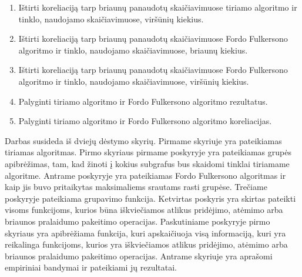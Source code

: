 \begin{enumerate}
\begin{enumerate}
			\item Ištirti koreliaciją tarp briaunų panaudotų skaičiavimuose tiriamo algoritmo ir tinklo, naudojamo skaičiavimuose, viršūnių kiekius. 
			\item Ištirti koreliaciją tarp briaunų panaudotų skaičiavimuose Fordo Fulkersono algoritmo ir tinklo, naudojamo skaičiavimuose, briaunų kiekius. 
			\item Ištirti koreliaciją tarp briaunų panaudotų skaičiavimuose Fordo Fulkersono algoritmo ir tinklo, naudojamo skaičiavimuose, viršūnių kiekius. 
			\item Palyginti tiriamo algoritmo ir Fordo Fulkersono algoritmo rezultatus.
			\item Palyginti tiriamo algoritmo ir Fordo Fulkersono algoritmo koreliacijas.
	\end{enumerate}
\end{enumerate}

Darbas susideda iš dviejų dėstymo skyrių. Pirmame skyriuje yra pateikiamas tiriamas algoritmas. Pirmo skyriaus pirmame poskyryje yra pateikiamas grupės apibrėžimas, tam, kad žinoti į kokius subgrafus bus skaidomi tinklai tiriamame algoritme. Antrame poskyryje yra pateikiamas Fordo Fulkersono algoritmas ir kaip jis buvo pritaikytas maksimaliems srautams rasti grupėse. Trečiame poskyryje pateikiama grupavimo funkcija. Ketvirtas poskyris yra skirtas pateikti visoms funkcijoms, kurios būna iškviečiamos  atlikus pridėjimo, atėmimo arba briaunos pralaidumo pakeitimo operacijas. Paskutiniame poskyryje pirmo skyriaus yra apibrėžiama funkcija, kuri apskaičiuoja visą informaciją, kuri yra  reikalinga funkcijoms, kurios yra iškviečiamos atlikus pridėjimo, atėmimo arba briaunos pralaidumo pakeitimo operacijas. Antrame skyriuje yra aprašomi empiriniai bandymai ir pateikiami jų rezultatai.